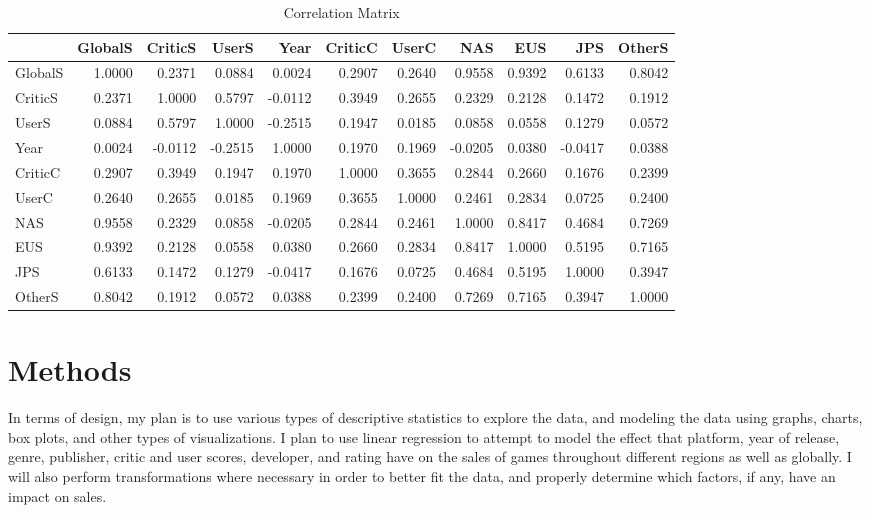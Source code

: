 \documentclass[12pt]{article}
\begin{document}
\begin{table}[ht]
  \caption{Correlation Matrix}
  \label{tab:correlation}
  \centering
  \small
  \begin{tabular}{lrrrrrrrrrr}
    \hline
    & GlobalS & CriticS & UserS & Year & CriticC & UserC & NAS & EUS & JPS & OtherS \\
    \hline
    GlobalS & 1.0000 & 0.2371 & 0.0884 & 0.0024 & 0.2907 & 0.2640 & 0.9558 & 0.9392 & 0.6133 & 0.8042 \\
    CriticS & 0.2371 & 1.0000 & 0.5797 & -0.0112 & 0.3949 & 0.2655 & 0.2329 & 0.2128 & 0.1472 & 0.1912 \\
    UserS & 0.0884 & 0.5797 & 1.0000 & -0.2515 & 0.1947 & 0.0185 & 0.0858 & 0.0558 & 0.1279 & 0.0572 \\
    Year & 0.0024 & -0.0112 & -0.2515 & 1.0000 & 0.1970 & 0.1969 & -0.0205 & 0.0380 & -0.0417 & 0.0388 \\
    CriticC & 0.2907 & 0.3949 & 0.1947 & 0.1970 & 1.0000 & 0.3655 & 0.2844 & 0.2660 & 0.1676 & 0.2399 \\
    UserC & 0.2640 & 0.2655 & 0.0185 & 0.1969 & 0.3655 & 1.0000 & 0.2461 & 0.2834 & 0.0725 & 0.2400 \\
    NAS & 0.9558 & 0.2329 & 0.0858 & -0.0205 & 0.2844 & 0.2461 & 1.0000 & 0.8417 & 0.4684 & 0.7269 \\
    EUS & 0.9392 & 0.2128 & 0.0558 & 0.0380 & 0.2660 & 0.2834 & 0.8417 & 1.0000 & 0.5195 & 0.7165 \\
    JPS & 0.6133 & 0.1472 & 0.1279 & -0.0417 & 0.1676 & 0.0725 & 0.4684 & 0.5195 & 1.0000 & 0.3947 \\
    OtherS & 0.8042 & 0.1912 & 0.0572 & 0.0388 & 0.2399 & 0.2400 & 0.7269 & 0.7165 & 0.3947 & 1.0000 \\
    \hline
  \end{tabular}
\end{table}



\section{Methods}
\label{sec:meth}
In terms of design, my plan is to use various types of descriptive statistics to explore the data, and modeling the data using graphs, 
charts, box plots, and other types of visualizations. I plan to use linear regression to attempt to model the effect that platform, 
year of release, genre, publisher, critic and user scores, developer, and rating have on the sales of games throughout different regions 
as well as globally. I will also perform transformations where necessary in order to better fit the data, and properly determine which 
factors, if any, have an impact on sales.
\end{document}
